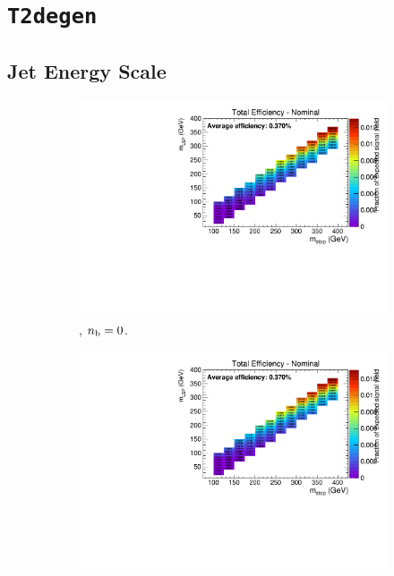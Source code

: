 \newpage
\section*{\texttt{T2degen}}
\label{sec:t2degen_syst_plots}

\newpage
\subsection*{Jet Energy Scale}
\label{sec:t2degen_jes_plots}

\begin{figure}[ht!]
  \centering
  \begin{subfigure}[b]{0.32\textwidth}
    \includegraphics[width=\textwidth, page=4]{Figs/sms/t2degen/v5/JES_T2_4body_v5_eq0b_le3j_incl.pdf}
    \caption{\njlow, $n_{\text{b}} = 0$.}
  \end{subfigure}
  \begin{subfigure}[b]{0.32\textwidth}
    \includegraphics[width=\textwidth, page=5]{Figs/sms/t2degen/v5/JES_T2_4body_v5_eq0b_le3j_incl.pdf}

\end{subfigure}
\end{figure}
